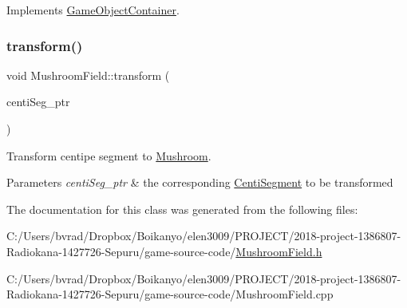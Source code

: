 Implements \mbox{\hyperlink{class_game_object_container_affa50b43ca7b82d54055b6499e024aba}{Game\+Object\+Container}}.

\mbox{\label{class_mushroom_field_aa182f3e0d33fccac34c7237e7994ecb7}} 
\subsubsection{\texorpdfstring{transform()}{transform()}}
{\footnotesize\ttfamily void Mushroom\+Field\+::transform (\begin{DoxyParamCaption}\item[{std\+::shared\+\_\+ptr$<$ \mbox{\hyperlink{class_game_object}{Game\+Object}} $>$}]{centi\+Seg\+\_\+ptr }\end{DoxyParamCaption})}



Transform centipe segment to \mbox{\hyperlink{class_mushroom}{Mushroom}}. 


\begin{DoxyParams}{Parameters}
{\em centi\+Seg\+\_\+ptr} & the corresponding \mbox{\hyperlink{class_centi_segment}{Centi\+Segment}} to be transformed \\
\hline
\end{DoxyParams}


The documentation for this class was generated from the following files\+:\begin{DoxyCompactItemize}
\item 
C\+:/\+Users/bvrad/\+Dropbox/\+Boikanyo/elen3009/\+P\+R\+O\+J\+E\+C\+T/2018-\/project-\/1386807-\/\+Radiokana-\/1427726-\/\+Sepuru/game-\/source-\/code/\mbox{\hyperlink{_mushroom_field_8h}{Mushroom\+Field.\+h}}\item 
C\+:/\+Users/bvrad/\+Dropbox/\+Boikanyo/elen3009/\+P\+R\+O\+J\+E\+C\+T/2018-\/project-\/1386807-\/\+Radiokana-\/1427726-\/\+Sepuru/game-\/source-\/code/Mushroom\+Field.\+cpp\end{DoxyCompactItemize}
